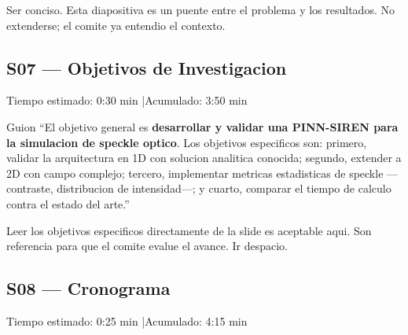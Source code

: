 \begin{tipbox}
Ser conciso. Esta diapositiva es un puente entre el problema y los resultados.
No extenderse; el comite ya entendio el contexto.
\end{tipbox}

\vspace{8pt}

\subsection{S07 --- Objetivos de Investigacion}

\begin{timebox}
Tiempo estimado: 0:30 min \quad|\quad Acumulado: 3:50 min
\end{timebox}
\vspace{4pt}

\begin{slidebox}{Guion}
``El objetivo general es \textbf{desarrollar y validar una PINN-SIREN para
la simulacion de speckle optico}. Los objetivos especificos son: primero,
validar la arquitectura en 1D con solucion analitica conocida; segundo, extender
a 2D con campo complejo; tercero, implementar metricas estadisticas de speckle
---contraste, distribucion de intensidad---; y cuarto, comparar el tiempo de
calculo contra el estado del arte.''
\end{slidebox}
\vspace{4pt}

\begin{tipbox}
Leer los objetivos especificos directamente de la slide es aceptable aqui.
Son referencia para que el comite evalue el avance. Ir despacio.
\end{tipbox}

\vspace{8pt}

\subsection{S08 --- Cronograma}

\begin{timebox}
Tiempo estimado: 0:25 min \quad|\quad Acumulado: 4:15 min
\end{timebox}
\vspace{4pt}


